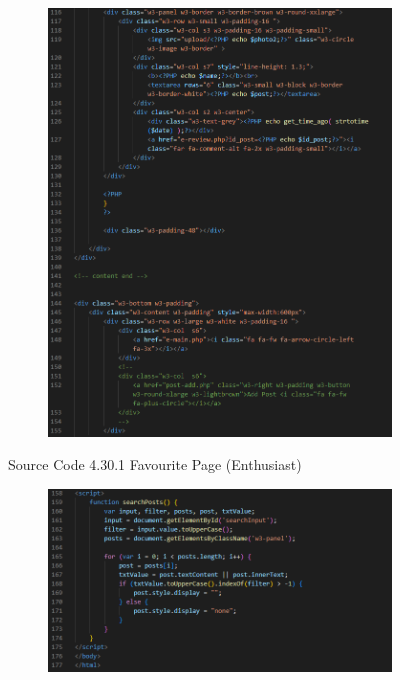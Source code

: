 \begin{enumerate}[1.]
\begin{figure}[h]
\begin{subfigure}[b]{0.7\textwidth}
            \label{fig:sub1}
        \end{subfigure}
        \hspace{0.04\textwidth}
        \begin{subfigure}[b]{0.7\textwidth}
            \centering
            \includegraphics[width=\textwidth]{mainmatter/images/frontend/code/efav2.png}
            \label{fig:sub2}
        \end{subfigure}
        \caption*{Source Code 4.30.1 Favourite Page (Enthusiast)}
        \label{fig:myfig69a}
    \end{figure}
    \clearpage
    \begin{figure}[h]\ContinuedFloat
        \centering
        \begin{subfigure}[b]{0.9\textwidth}
            \centering
            \includegraphics[width=\textwidth]{mainmatter/images/frontend/code/efav3.png}

\end{subfigure}
\end{figure}
\end{enumerate}
